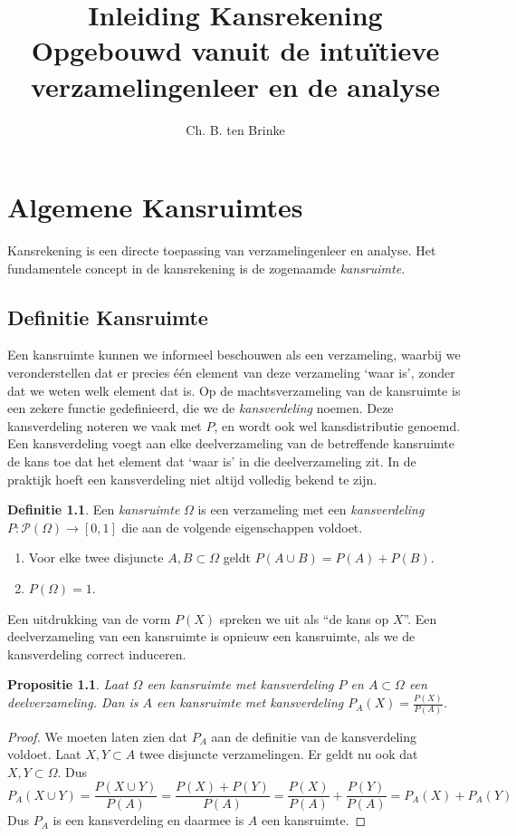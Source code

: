 \documentclass[a4paper]{report}
\title{Inleiding Kansrekening \\ \small{Opgebouwd vanuit de intu\"itieve verzamelingenleer en de analyse}}
\author{Ch. B. ten Brinke}
\newtheorem{proposition}[theorem]{Propositie}
\theoremstyle{definition}
\newtheorem{definition}[theorem]{Definitie}
\begin{document}
\maketitle

\chapter{Algemene Kansruimtes}
Kansrekening is een directe toepassing van verzamelingenleer en analyse.
Het fundamentele concept in de kansrekening is de zogenaamde \emph{kansruimte}.

\section{Definitie Kansruimte}
Een kansruimte kunnen we informeel beschouwen als een verzameling, waarbij we veronderstellen dat er precies \'e\'en element van deze verzameling `waar is', zonder dat we weten welk element dat is.
Op de machtsverzameling van de kansruimte is een zekere functie gedefinieerd, die we de \emph{kansverdeling} noemen.
Deze kansverdeling noteren we vaak met $P$, en wordt ook wel kansdistributie genoemd.
Een kansverdeling voegt aan elke deelverzameling van de betreffende kansruimte de kans toe dat het element dat `waar is' in die deelverzameling zit.
In de praktijk hoeft een kansverdeling niet altijd volledig bekend te zijn.

\begin{definition}
    Een \emph{kansruimte} $\Omega$ is een verzameling met een \emph{kansverdeling} $P: \mathcal P(\Omega) \to [0,1]$  die aan de volgende eigenschappen voldoet.
    \begin{enumerate}[i]
        \item Voor elke twee disjuncte $A,B \subset \Omega$ geldt $P(A \cup B) = P(A) + P(B)$.
        \item $P(\Omega) = 1$.
    \end{enumerate}
\end{definition}

Een uitdrukking van de vorm $P(X)$ spreken we uit als ``de kans op $X$''.
Een deelverzameling van een kansruimte is opnieuw een kansruimte, als we de kansverdeling correct induceren.
\begin{proposition}
    Laat $\Omega$ een kansruimte met kansverdeling $P$ en $A \subset \Omega$ een deelverzameling.
    Dan is $A$ een kansruimte met kansverdeling $P_A(X) = \frac{P(X)}{P(A)}$.
\end{proposition}
\begin{proof}
    We moeten laten zien dat $P_A$ aan de definitie van de kansverdeling voldoet.
    Laat $X,Y \subset A$ twee disjuncte verzamelingen.
    Er geldt nu ook dat $X,Y \subset \Omega$.
    Dus \[ P_A(X \cup Y) = \frac{P(X \cup Y)}{P(A)} = \frac{P(X) + P(Y)}{P(A)} = \frac{P(X)}{P(A)} + \frac{P(Y)}{P(A)} = P_A(X) + P_A(Y) \]
    Dus $P_A$ is een kansverdeling en daarmee is $A$ een kansruimte.
\end{proof}
\end{document}
